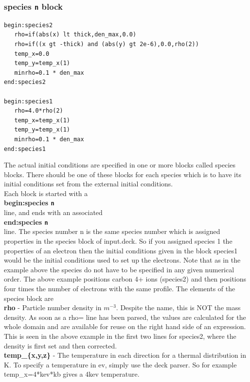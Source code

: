 \documentclass[12pt,a4paper]{article}
\newcommand{\emphtext}{\color{warwickdark} \fontfamily{phv}\selectfont\Large\bf}
\newcommand{\boxverbatim}[1]{\begin{Verbatim}[obeytabs=true,frame=single,
  framerule=0.5mm,rulecolor=\color{warwickmid},formatcom=\color{black},label=#1]}
\newcommand{\inlinecode}[1]{{\color{warwickred} \bf\texttt{#1}}}
\newcommand{\inlineemph}[1]{{\color{warwicklight} \bf{#1}}}
\begin{document}
\subsubsection{\inlineemph{species\inlinecode{n}} block}
\boxverbatim{species{\it n} block}
begin:species2
   rho=if(abs(x) lt thick,den_max,0.0)
   rho=if((x gt -thick) and (abs(y) gt 2e-6),0.0,rho(2))
   temp_x=0.0
   temp_y=temp_x(1)
   minrho=0.1 * den_max
end:species2

begin:species1
   rho=4.0*rho(2)
   temp_x=temp_x(1)
   temp_y=temp_x(1)
   minrho=0.1 * den_max
end:species1
\end{Verbatim}

The actual initial conditions are specified in one or more blocks called
species blocks. There should be one of these blocks for each species which is
to have its initial conditions set from the external initial conditions.\\

Each block is started with a\\

{\emphtext begin:species\inlinecode{n}}\\

line, and ends with an associated \\

{\emphtext end:species\inlinecode{n}}\\

line. The species number n is the same species number which is assigned
properties in the species block of input.deck. So if you assigned species 1 the
properties of an electron then the initial conditions given in the block
species1 would be the initial conditions used to set up the electrons. Note
that as in the example above the species do not have to be specified in any
given numerical order. The above example positions carbon 4+ ions (species2)
and then positions four times the number of electrons with the same
profile. The elements of the species block are\\

{\emphtext rho} - Particle number density in $m^{-3}$. Despite the name, this
is NOT the mass density. As soon as a rho= line has been parsed, the values are
calculated for the whole domain and are available for reuse on the right hand
side of an expression. This is seen in the above example in the first two lines
for species2, where the density is first set and then corrected.\\

{\emphtext temp\_\{x,y,z\}} - The temperature in each direction for a thermal
distribution in K. To specify a temperature in ev, simply use the deck
parser. So for example temp\_x=4*kev*kb gives a 4kev temperature.\\
\end{document}
